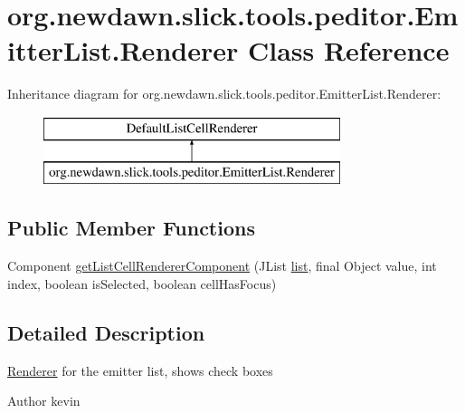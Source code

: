 \hypertarget{classorg_1_1newdawn_1_1slick_1_1tools_1_1peditor_1_1_emitter_list_1_1_renderer}{}\section{org.\+newdawn.\+slick.\+tools.\+peditor.\+Emitter\+List.\+Renderer Class Reference}
\label{classorg_1_1newdawn_1_1slick_1_1tools_1_1peditor_1_1_emitter_list_1_1_renderer}
Inheritance diagram for org.\+newdawn.\+slick.\+tools.\+peditor.\+Emitter\+List.\+Renderer\+:\begin{figure}[H]
\begin{center}
\leavevmode
\includegraphics[height=2.000000cm]{classorg_1_1newdawn_1_1slick_1_1tools_1_1peditor_1_1_emitter_list_1_1_renderer}
\end{center}
\end{figure}
\subsection*{Public Member Functions}
\begin{DoxyCompactItemize}
\item 
Component \mbox{\hyperlink{classorg_1_1newdawn_1_1slick_1_1tools_1_1peditor_1_1_emitter_list_1_1_renderer_a51309c374a3c26cbe839eda1087d9995}{get\+List\+Cell\+Renderer\+Component}} (J\+List \mbox{\hyperlink{classorg_1_1newdawn_1_1slick_1_1tools_1_1peditor_1_1_emitter_list_a201acbbfa375f50045f4f87452a9c722}{list}}, final Object value, int index, boolean is\+Selected, boolean cell\+Has\+Focus)
\end{DoxyCompactItemize}


\subsection{Detailed Description}
\mbox{\hyperlink{classorg_1_1newdawn_1_1slick_1_1tools_1_1peditor_1_1_emitter_list_1_1_renderer}{Renderer}} for the emitter list, shows check boxes

\begin{DoxyAuthor}{Author}
kevin 
\end{DoxyAuthor}



